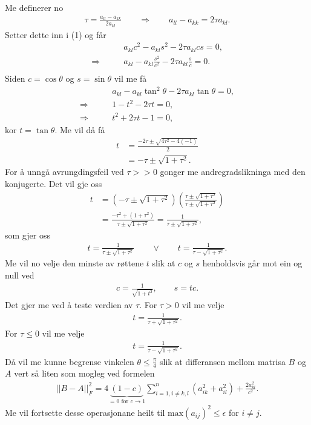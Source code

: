 \documentclass[11pt, a4paper]{article}
\begin{document}
    Me definerer no 
    \begin{align*}
      \tau = \frac{a_{ll} - a_{kk}}{2a_{kl}} \qquad \Rightarrow \qquad a_{ll} - a_{kk} = 2\tau a_{kl}.
    \end{align*}
    Setter dette inn i (1) og får
    \begin{align*}
      &a_{kl}c^2 - a_{kl}s^2 - 2\tau a_{kl}cs = 0, \\
      \Rightarrow \qquad &a_{kl} - a_{kl}\frac{s^2}{c^2} - 2\tau a_{kl}\frac{s}{c} = 0. \\
    \end{align*}
    Siden $c = \cos{\theta}$ og $s = \sin{\theta}$ vil me få 
    \begin{align*}
      &a_{kl} - a_{kl}\tan^2{\theta} - 2\tau a_{kl} \tan{\theta} = 0, \\
      \Rightarrow \qquad &1 - t^2 - 2\tau t = 0, \\
      \Rightarrow \qquad &t^2 + 2\tau t - 1 = 0,
    \end{align*}
    kor $t = \tan{\theta}$. Me vil då få 
    \begin{align*}
      t &= \frac{-2\tau \pm \sqrt{4\tau^2 - 4(-1)}}{2} \\
      &= -\tau \pm \sqrt{1 + \tau^2}.
    \end{align*}
    For å unngå avrungdingsfeil ved $\tau >> 0$ gonger me andregradslikninga med den konjugerte. Det vil gje oss
    \begin{align*}
      t &= \left( -\tau \pm \sqrt{1 + \tau^2} \right)\left( \frac{\tau \pm \sqrt{1 + \tau^2}}{\tau \pm \sqrt{1 + \tau^2}} \right) \\
      &= \frac{-\tau^2 + (1 + \tau^2)}{\tau \pm \sqrt{1 + \tau^2}} = \frac{1}{\tau \pm \sqrt{1 + \tau^2}},
    \end{align*}
    som gjer oss
    \begin{align*}
      t = \frac{1}{\tau \pm \sqrt{1 + \tau^2}} \qquad \lor \qquad t = \frac{1}{\tau - \sqrt{1 + \tau^2}}.
    \end{align*}
    Me vil no velje den minste av røttene $t$ slik at $c$ og $s$ henholdsvis går mot ein og null ved
    \begin{align*}
      c = \frac{1}{\sqrt{1 + t^2}}, \qquad s = tc.
    \end{align*}
    Det gjer me ved å teste verdien av $\tau$. For $\tau > 0$ vil me velje 
    \begin{align*}
      t = \frac{1}{\tau + \sqrt{1 + \tau^2}}.
    \end{align*}
    For $\tau \leq 0$ vil me velje
    \begin{align*}
      t = \frac{1}{\tau - \sqrt{1 + \tau^2}}.
    \end{align*}
    Då vil me kunne begrense vinkelen $\theta \leq \frac{\pi}{4}$ slik at differansen mellom matrisa $B$ og $A$ vert så liten som mogleg ved formelen
    \begin{align*}
      \lvert\lvert B - A \rvert\rvert_F^2 = 4\underbrace{(1 - c)}_{= 0 \text{ for } c \to 1}\sum_{i = 1, i\ne k, l}^n(a_{ik}^2 + a_{il}^2) + \frac{2a_{kl}^2}{c^2}.
    \end{align*}
    Me vil fortsette desse operasjonane heilt til $\text{max}(a_{ij})^2 \leq \epsilon$ for $i \ne j$.
\end{document}
